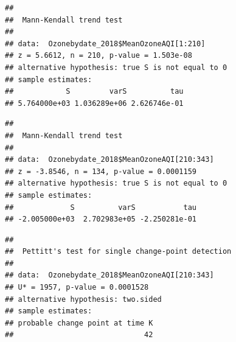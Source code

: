 \documentclass[12pt,]{article}
\newenvironment{Shaded}{\begin{snugshade}}{\end{snugshade}}
\newcommand{\KeywordTok}[1]{\textcolor[rgb]{0.13,0.29,0.53}{\textbf{#1}}}
\newcommand{\DecValTok}[1]{\textcolor[rgb]{0.00,0.00,0.81}{#1}}
\newcommand{\CommentTok}[1]{\textcolor[rgb]{0.56,0.35,0.01}{\textit{#1}}}
\newcommand{\OperatorTok}[1]{\textcolor[rgb]{0.81,0.36,0.00}{\textbf{#1}}}
\newcommand{\NormalTok}[1]{#1}
\begin{document}
\begin{Shaded}
\end{Shaded}

\begin{verbatim}
## 
##  Mann-Kendall trend test
## 
## data:  Ozonebydate_2018$MeanOzoneAQI[1:210]
## z = 5.6612, n = 210, p-value = 1.503e-08
## alternative hypothesis: true S is not equal to 0
## sample estimates:
##            S         varS          tau 
## 5.764000e+03 1.036289e+06 2.626746e-01
\end{verbatim}

\begin{Shaded}
\end{Shaded}

\begin{verbatim}
## 
##  Mann-Kendall trend test
## 
## data:  Ozonebydate_2018$MeanOzoneAQI[210:343]
## z = -3.8546, n = 134, p-value = 0.0001159
## alternative hypothesis: true S is not equal to 0
## sample estimates:
##             S          varS           tau 
## -2.005000e+03  2.702983e+05 -2.250281e-01
\end{verbatim}

\begin{Shaded}
\end{Shaded}

\begin{verbatim}
## 
##  Pettitt's test for single change-point detection
## 
## data:  Ozonebydate_2018$MeanOzoneAQI[210:343]
## U* = 1957, p-value = 0.0001528
## alternative hypothesis: two.sided
## sample estimates:
## probable change point at time K 
##                              42
\end{verbatim}
\end{document}
